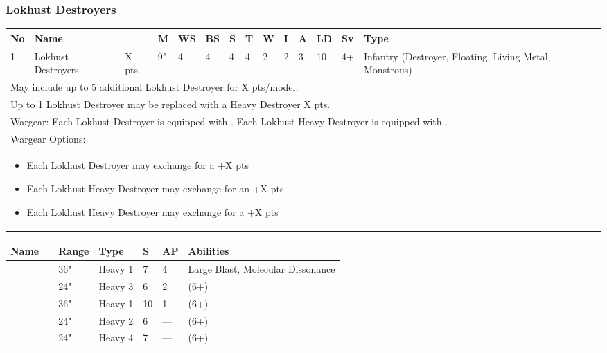 \subsubsection{Lokhust Destroyers}
 
\noindent
\begin{tabular}{||m{10pt} m{90pt} m{30pt} m{11pt} m{11pt} m{11pt} m{11pt} m{11pt} m{11pt} m{11pt} m{11pt} m{11pt} m{11pt} m{135pt}||}
	\hline
	No & Name & & M & WS & BS & S & T & W & I & A & LD & Sv & Type \\
	\hline
	1 & Lokhust Destroyers & X pts & 9" & 4 & 4 & 4 & 4 & 2 & 2 & 3 & 10 & 4+ & Infantry (Destroyer, Floating, Living Metal, Monstrous) \\
	\hline
	\hline
	\multicolumn{14}{||Z{532 pt}||}{May include up to 5 additional Lokhust Destroyer for X pts/model.} \\	
	\multicolumn{14}{||Z{532 pt}||}{Up to 1 Lokhust Destroyer may be replaced with a Heavy Destroyer X pts.} \\	
	\hline
	\hline
	\multicolumn{14}{||Z{532 pt}||}{Wargear: Each Lokhust Destroyer is equipped with \quickref{Gauss Cannon}. Each Lokhust Heavy Destroyer is equipped with \quickref{Gauss Destructor}.} \\
	\multicolumn{14}{||Z{532 pt}||}{Wargear Options:} \\	\multicolumn{14}{||Z{532 pt}||}{\begin{itemize}
			\item Each Lokhust Destroyer may exchange \quickref{Gauss Cannon} for a \quickref{Tesla Cannon} \hrulefill +X pts
			\item Each Lokhust Heavy Destroyer may exchange \quickref{Gauss Destructor} for an \quickref{Enmitic Exterminator} \hrulefill +X pts
			\item Each Lokhust Heavy Destroyer may exchange \quickref{Gauss Destructor} for a \quickref{Tesla Destructor} \hrulefill +X pts
	\end{itemize}} \\
	\hline
\end{tabular}

\noindent
\begin{tabular}{||m{110pt} m{30pt} m{31pt} m{55pt} m{12pt} m{12pt} m{210pt}||}
	\hline
	Name & & Range & Type & S & AP & Abilities \\
	\hline
	\quickref{Enmitic Exterminator} &  & 36" & Heavy 1 & 7 & 4 & Large Blast, Molecular Dissonance \\
	\quickref{Gauss Cannon} &  & 24" & Heavy 3 & 6 & 2 & \quickref{Gauss} (6+) \\
	\quickref{Gauss Destructor} &  & 36" & Heavy 1 & 10 & 1 &  \quickref{Gauss} (6+) \\
	\quickref{Tesla Cannon} &  & 24" & Heavy 2 & 6 & — & \quickref{Tesla} (6+) \\
	\quickref{Tesla Destructor} &  & 24" & Heavy 4 & 7 & — &  \quickref{Tesla} (6+) \\
	\hline
\end{tabular}

